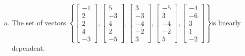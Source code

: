 \begin{exerciseAnswer}
\begin{enumerate}[(a)]
\item  The set of vectors \( \left\{ \left[\begin{array}{c}
-1 \\
2 \\
2 \\
4 \\
-3
\end{array}\right] , \left[\begin{array}{c}
5 \\
-3 \\
4 \\
2 \\
-5
\end{array}\right] , \left[\begin{array}{c}
3 \\
-3 \\
-4 \\
-2 \\
3
\end{array}\right] , \left[\begin{array}{c}
-5 \\
3 \\
-4 \\
-2 \\
5
\end{array}\right] , \left[\begin{array}{c}
-4 \\
-6 \\
3 \\
1 \\
-2
\end{array}\right] \right\} \)is linearly dependent.
\end{enumerate}
    
\end{exerciseAnswer}
    
